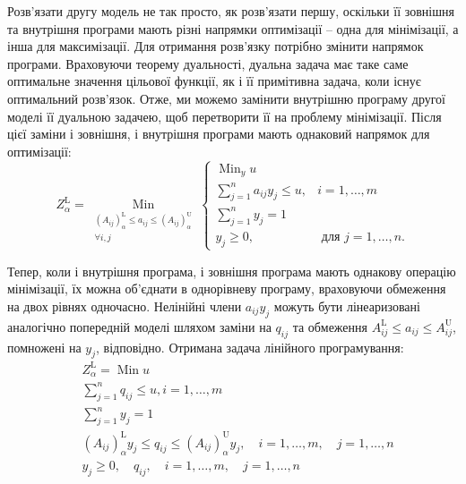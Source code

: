 \documentclass[14pt, a4paper, oneside]{extarticle}
\numberwithin{equation}{section}
\begin{document}
Розв'язати другу модель не так просто, як розв'язати першу, оскільки її зовнішня та внутрішня програми мають різні напрямки оптимізації -- одна для мінімізації, а інша для максимізації. Для отримання розв'язку потрібно змінити напрямок програми. Враховуючи теорему дуальності, дуальна задача має таке саме оптимальне значення цільової функції, як і її примітивна задача, коли існує оптимальний розв'язок. Отже, ми можемо замінити внутрішню програму другої моделі її дуальною задачею, щоб перетворити її на проблему мінімізації. Після цієї заміни і зовнішня, і внутрішня програми мають однаковий напрямок для оптимізації:
\begin{equation}
Z_{\alpha}^{\mathrm{L}}=\underset{\substack{\left(A_{i j}\right)_{\alpha}^{\mathrm{L}} \leq a_{i j} \leq\left(A_{i j}\right)_{\alpha}^{\mathrm{U}} \\
\forall i, j}}{\operatorname{Min}}\left\{\begin{array}{ll}
\operatorname{Min}_{y} u \\
\sum_{j=1}^{n} a_{i j} y_{j} \leq u, & i=1, \ldots, m \\
\sum_{j=1}^{n} y_{j}=1 \\
y_{j} \geq 0, & \text { для } j=1, \ldots, n.
\end{array}\right.
\end{equation}

Тепер, коли і внутрішня програма, і зовнішня програма мають однакову операцію мінімізації, їх можна об'єднати в однорівневу програму, враховуючи обмеження на двох рівнях одночасно. Нелінійні члени $a_{i j} y_{j}$ можуть бути лінеаризовані аналогічно попередній моделі шляхом заміни на $q_{i j}$ та обмеження $A_{i j}^{\mathrm{L}} \leq a_{i j} \leq A_{i j}^{\mathrm{U}}$, помножені на $y_{j}$, відповідно. Отримана задача лінійного програмування:
\begin{equation}
\begin{aligned}
& Z_{\alpha}^{\mathrm{L}}= \operatorname{Min} u \\
& \sum_{j=1}^{n} q_{i j} \leq u, i=1, \ldots, m \\
& \sum_{j=1}^{n} y_{j}=1 \\
&\left(A_{i j}\right)_{\alpha}^{\mathrm{L}} y_{j} \leq q_{i j} \leq\left(A_{i j}\right)_{\alpha}^{\mathrm{U}} y_{j}, \quad i=1, \ldots, m, \quad j=1, \ldots, n \\
& y_{j} \geq 0, \quad q_{i j}, \quad i=1, \ldots, m, \quad j=1, \ldots, n
\end{aligned}
\end{equation}
\end{document}
